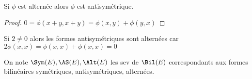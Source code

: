 \begin{lmm}
Si $\phi$ est alternée alors  $\phi$ est antisymétrique.
\end{lmm}

\begin{proof}
    $0=\phi(x + y, x+y)=\phi(x, y)+\phi(y, x)$
\end{proof}

\begin{rem}
    Si $2\neq 0$ alors les formes antisymétriques sont alternées car  $2\phi(x, x)=\phi(x, x)+\phi(x, x)=0$
\end{rem}

\begin{rem}
    On note $\Sym(E), \AS(E), \Alt(E)$ les sev de  $\Bil(E)$ correspondants aux formes bilinéaires symétriques, antisymétriques, alternées.
\end{rem}

